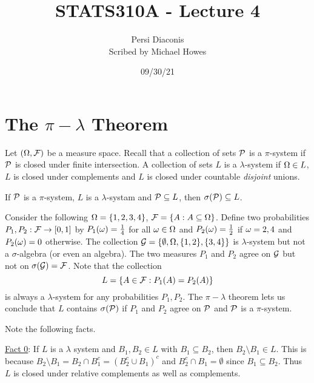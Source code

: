 




\title{STATS310A - Lecture 4}
\author{Persi Diaconis\\ Scribed by Michael Howes}
\date{09/30/21}

\pagestyle{fancy}
\fancyhf{}


\maketitle
\tableofcontents
\section{The $\pi-\lambda$ Theorem}
Let $({{\Omega}}, {\mathcal{F}})$ be a measure space. Recall that a collection of sets ${\mathcal{P}}$ is a $\pi$-system if ${\mathcal{P}}$ is closed under finite intersection. A collection of sets $L$ is a $\lambda$-system if ${{\Omega}} \in L$, $L$ is closed under complements and $L$ is closed under countable \emph{disjoint} unions. 

\begin{thrm}
    If ${\mathcal{P}}$ is a $\pi$-system, $L$ is a $\lambda$-systam and ${\mathcal{P}} \subseteq L$, then $\sigma({\mathcal{P}}) \subseteq L$.
\end{thrm}
\begin{ex}
    Consider the following ${{\Omega}} = \{1,2,3,4\}$, ${\mathcal{F}} = \{A:A\subseteq {{\Omega}} \}$. Define two probabilities $P_1, P_2 : {\mathcal{F}} \to [0,1]$ by $P_1({\omega}) = \frac{1}{4}$ for all ${\omega} \in {{\Omega}}$ and $P_2({\omega}) = \frac{1}{2}$ if ${\omega} = 2,4$ and $P_2({\omega}) = 0$ otherwise. The collection ${\mathcal{G}} = \{\emptyset, {{\Omega}}, \{1,2\}, \{3,4\}\}$ is $\lambda$-system but not a $\sigma$-algebra (or even an algebra). The two measures $P_1$ and $P_2$ agree on ${\mathcal{G}}$ but not on $\sigma({\mathcal{G}}) = {\mathcal{F}}$. Note that the collection \[L = \{A \in {\mathcal{F}} : P_1(A) = P_2(A)\}\] is always a $\lambda$-system for any probabilities $P_1,P_2$. The $\pi-\lambda$ theorem lets us conclude that $L$ contains $\sigma({\mathcal{P}})$ if $P_1$ and $P_2$ agree on ${\mathcal{P}}$ and ${\mathcal{P}}$ is a $\pi$-system.
\end{ex}
Note the following facts.

\underline{Fact 0}: If $L$ is a $\lambda$ system and $B_1,B_2 \in L$ with $B_1 \subseteq B_2$, then $B_2 \setminus B_1 \in L$. This is because $B_2 \setminus B_1 = B_2 \cap B_1^c = (B_2^c \cup B_1)^c$ and $B_2^c \cap B_1 = \emptyset$ since $B_1 \subseteq B_2$. Thus $L$ is closed under relative complements as well as complements.

